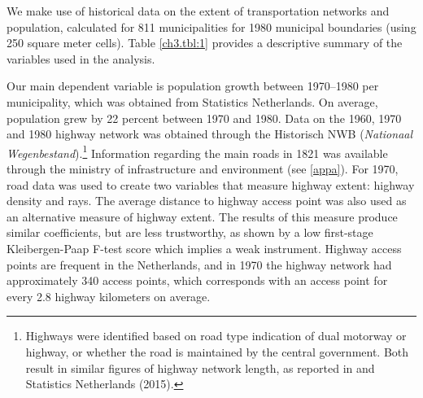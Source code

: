 \documentclass[a4paper,authoryear,review]{elsarticle}  	%
\begin{document}
	We make use of historical data on the extent of transportation networks and population, calculated for 811 municipalities for 1980 municipal boundaries (using 250 square meter cells). Table \ref{ch3.tbl:1} provides a descriptive summary of the variables used in the analysis. 
	
	Our main dependent variable is population growth between 1970--1980 per municipality, which was obtained from Statistics Netherlands. On average, population grew by 22 percent between 1970 and 1980. Data on the 1960, 1970 and 1980 highway network was obtained through the Historisch NWB (\emph{Nationaal Wegenbestand}).\footnote{Highways were identified based on road type indication of dual motorway or highway, or whether the road is maintained by the central government. Both result in similar figures of highway network length, as reported in \citet{Ligtermoet1990} and Statistics Netherlands (2015).} Information regarding the main roads in 1821 was available through the ministry of infrastructure and environment (see \ref{appa}). For 1970, road data was used to create two variables that measure highway extent: highway density and rays. The average distance to highway access point was also used as an alternative measure of highway extent. The results of this measure produce similar coefficients, but are less trustworthy, as shown by a low first-stage Kleibergen-Paap F-test score which implies a weak instrument. Highway access points are frequent in the Netherlands, and in 1970 the highway network had approximately 340 access points, which corresponds with an access point for every 2.8 highway kilometers on average.
	
	
	
\end{document}
